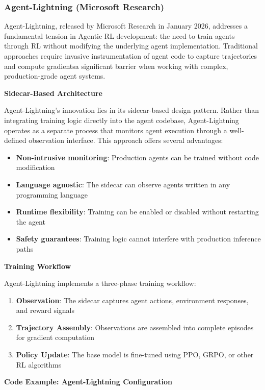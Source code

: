 \subsubsection{Agent-Lightning (Microsoft Research)}

Agent-Lightning, released by Microsoft Research in January 2026, addresses a fundamental tension in Agentic RL development: the need to train agents through RL without modifying the underlying agent implementation. Traditional approaches require invasive instrumentation of agent code to capture trajectories and compute gradientsa significant barrier when working with complex, production-grade agent systems.

\textbf{Sidecar-Based Architecture}

Agent-Lightning's innovation lies in its sidecar-based design pattern. Rather than integrating training logic directly into the agent codebase, Agent-Lightning operates as a separate process that monitors agent execution through a well-defined observation interface. This approach offers several advantages:

\begin{itemize}
    \item \textbf{Non-intrusive monitoring}: Production agents can be trained without code modification
    \item \textbf{Language agnostic}: The sidecar can observe agents written in any programming language
    \item \textbf{Runtime flexibility}: Training can be enabled or disabled without restarting the agent
    \item \textbf{Safety guarantees}: Training logic cannot interfere with production inference paths

\end{itemize}
\textbf{Training Workflow}

Agent-Lightning implements a three-phase training workflow:

\begin{enumerate}
    \item \textbf{Observation}: The sidecar captures agent actions, environment responses, and reward signals
    \item \textbf{Trajectory Assembly}: Observations are assembled into complete episodes for gradient computation
    \item \textbf{Policy Update}: The base model is fine-tuned using PPO, GRPO, or other RL algorithms

\end{enumerate}
\textbf{Code Example: Agent-Lightning Configuration}

